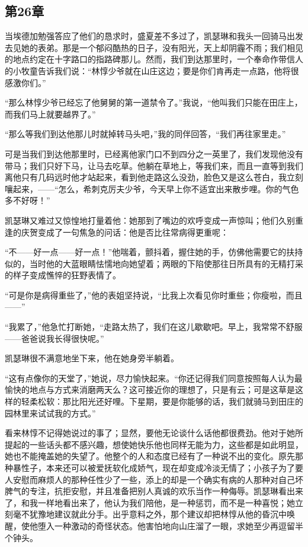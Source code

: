 \subsection{第26章}

\par 当埃德加勉强答应了他们的恳求时，盛夏差不多过了，凯瑟琳和我头一回骑马出发去见她的表弟。那是一个郁闷酷热的日子，没有阳光，天上却阴霾不雨；我们相见的地点约定在十字路口的指路碑那儿。然而，我们到达那里时，一个奉命作带信人的小牧童告诉我们说：“林惇少爷就在山庄这边；要是你们肯再走一点路，他将很感激你们。”
\par “那么林惇少爷已经忘了他舅舅的第一道禁令了。”我说，“他叫我们只能在田庄上，而我们马上就要越界了。”
\par “那么等我们到达他那儿时就掉转马头吧，”我的同伴回答，“我们再往家里走。”
\par 可是当我们到达他那里时，已经离他家门口不到四分之一英里了，我们发现他没有带马；我们只好下马，让马去吃草。他躺在草地上，等我们来，而且一直等到我们离他只有几码远时他才站起来，看到他走路这么没劲，脸色又是这么苍白，我立刻嚷起来，——“怎么，希刺克厉夫少爷，今天早上你不适宜出来散步哩。你的气色多不好呀！”
\par 凯瑟琳又难过又惊惶地打量着他：她那到了嘴边的欢呼变成一声惊叫；他们久别重逢的庆贺变成了一句焦急的问话：他是否比往常病得更重呢：
\par “不——好一点——好一点！”他喘着，颤抖着，握住她的手，仿佛他需要它的扶持似的，当时他的大蓝眼睛怯懦地向她望着；两眼的下陷使那往日所具有的无精打采的样子变成憔悴的狂野表情了。
\par “可是你是病得重些了，”他的表姐坚持说，“比我上次看见你时重些；你瘦啦，而且——”
\par “我累了，”他急忙打断她，“走路太热了，我们在这儿歇歇吧。早上，我常常不舒服——爸爸说我长得很快呢。”
\par 凯瑟琳很不满意地坐下来，他在她身旁半躺着。
\par “这有点像你的天堂了，”她说，尽力愉快起来。“你还记得我们同意按照每人认为最愉快的地点与方式来消磨两天么？这可接近你的理想了，只是有云；可是这草是这样的轻柔松软：那比阳光还好哩。下星期，要是你能够的话，我们就骑马到田庄的园林里来试试我的方式。”
\par 看来林惇不记得她说过的事了；显然，要他无论谈什么话他都很费劲。他对于她所提起的一些话头都不感兴趣，想使她快乐他也同样无能为力，这些都是如此明显，她也不能掩盖她的失望了。他整个的人和态度已经有了一种说不出的变化。原先那种暴性子，本来还可以被爱抚软化成娇气，现在却变成冷淡无情了；小孩子为了要人安慰而麻烦人的那种任性少了一些，添上的却是一个确实有病的人那种对自己坏脾气的专注，抗拒安慰，并且准备把别人真诚的欢乐当作一种侮辱。凯瑟琳看出来了，和我一样地看出来了，他认为我们陪他，是一种惩罚，而不是一种喜悦；她立刻毫不犹豫地建议就此分手。出乎意料之外，那个建议却把林惇从他的昏沉中唤醒，使他堕入一种激动的奇怪状态。他害怕地向山庄溜了一眼，求她至少再逗留半个钟头。
